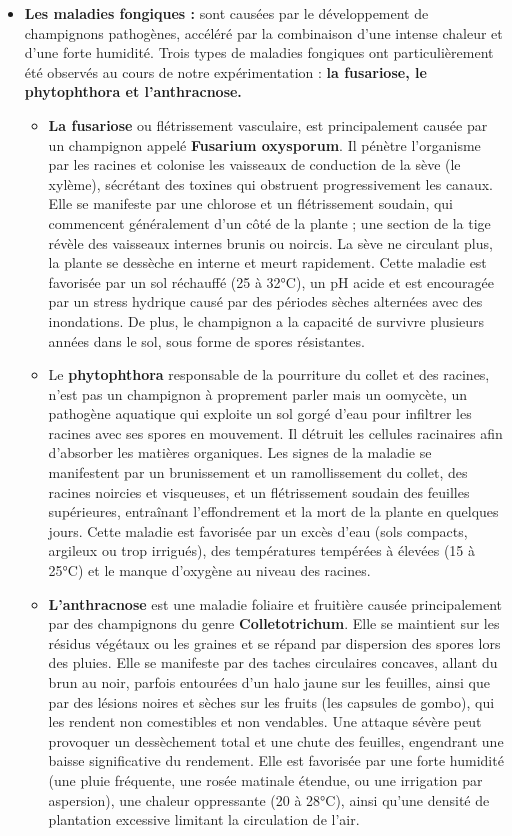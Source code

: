 \begin{itemize}[label=$\bullet$]
   	\item \textbf{Les maladies fongiques : } sont causées par le développement de champignons pathogènes, accéléré par la combinaison d'une intense chaleur et d'une forte humidité. Trois types de maladies fongiques ont particulièrement été observés au cours de notre expérimentation : \textbf{la fusariose, le phytophthora et l'anthracnose.}

    \begin{itemize}[label=$\circ$]
   	\item \textbf{La fusariose}
ou flétrissement vasculaire, est principalement causée par un champignon appelé \textbf{Fusarium oxysporum}. Il pénètre l'organisme par les racines et colonise les vaisseaux de conduction de la sève (le xylème), sécrétant des toxines qui obstruent progressivement les canaux. Elle se manifeste par une chlorose et un flétrissement soudain, qui commencent généralement d'un côté de la plante ; une section de la tige révèle des vaisseaux internes brunis ou noircis. La sève ne circulant plus, la plante se dessèche en interne et meurt rapidement. Cette maladie est favorisée par un sol réchauffé (25 à 32°C), un pH acide et est encouragée par un stress hydrique causé par des périodes sèches alternées avec des inondations. De plus, le champignon a la capacité de survivre plusieurs années dans le sol, sous forme de spores résistantes.

    \item Le \textbf{phytophthora} responsable de la pourriture du collet et des racines, n'est pas un champignon à proprement parler mais un oomycète, un pathogène aquatique qui exploite un sol gorgé d'eau pour infiltrer les racines avec ses spores en mouvement. Il détruit les cellules racinaires afin d'absorber les matières organiques. Les signes de la maladie se manifestent par un brunissement et un ramollissement du collet, des racines noircies et visqueuses, et un flétrissement soudain des feuilles supérieures, entraînant l'effondrement et la mort de la plante en quelques jours. Cette maladie est favorisée par un excès d'eau (sols compacts, argileux ou trop irrigués), des températures tempérées à élevées  (15 à 25°C) et le manque d'oxygène au niveau des racines.

    \item \textbf{L'anthracnose} est une maladie foliaire et fruitière causée principalement par des champignons du genre \textbf{Colletotrichum}. Elle se maintient sur les résidus végétaux ou les graines et se répand par dispersion des spores lors des pluies. Elle se manifeste par des taches circulaires concaves, allant du brun au noir, parfois entourées d'un halo jaune sur les feuilles, ainsi que par des lésions noires et sèches sur les fruits (les capsules de gombo), qui les rendent non comestibles et non vendables. Une attaque sévère peut provoquer un dessèchement total et une chute des feuilles, engendrant une baisse significative du rendement. Elle est favorisée par une forte humidité (une pluie fréquente, une rosée matinale étendue, ou une irrigation par aspersion), une chaleur oppressante (20 à 28°C), ainsi qu'une densité de plantation excessive limitant la circulation de l'air.
    

\end{itemize}
\end{itemize}
